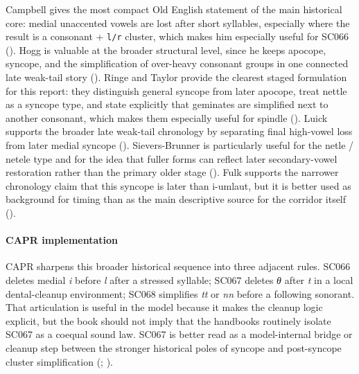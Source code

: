 \documentclass[
  british,
  a4paper,
]{article}
\begin{document}
Campbell gives the most compact Old English statement of the main
historical core: medial unaccented vowels are lost after short
syllables, especially where the result is a consonant + \texttt{l/r}
cluster, which makes him especially useful for SC066
(). Hogg is
valuable at the broader structural level, since he keeps apocope,
syncope, and the simplification of over-heavy consonant groups in one
connected late weak-tail story (). Ringe and Taylor provide the clearest staged formulation for
this report: they distinguish general syncope from later apocope, treat
nettle as a syncope type, and state explicitly that geminates are
simplified next to another consonant, which makes them especially useful
for spindle (). Luick supports the broader late weak-tail
chronology by separating final high-vowel loss from later medial syncope
().
Sievers-Brunner is particularly useful for the netle / netele type and
for the idea that fuller forms can reflect later secondary-vowel
restoration rather than the primary older stage
(). Fulk
supports the narrower chronology claim that this syncope is later than
i-umlaut, but it is better used as background for timing than as the
main descriptive source for the corridor itself
().

\paragraph{CAPR implementation}\label{capr-implementation-42}

CAPR sharpens this broader historical sequence into three adjacent
rules. SC066 deletes medial \emph{i} before \emph{l} after a stressed
syllable; SC067 deletes \emph{θ} after \emph{t} in a local
dental-cleanup environment; SC068 simplifies \emph{tt} or \emph{nn}
before a following sonorant. That articulation is useful in the model
because it makes the cleanup logic explicit, but the book should not
imply that the handbooks routinely isolate SC067 as a coequal sound law.
SC067 is better read as a model-internal bridge or cleanup step between
the stronger historical poles of syncope and post-syncope cluster
simplification (;
).
\end{document}
